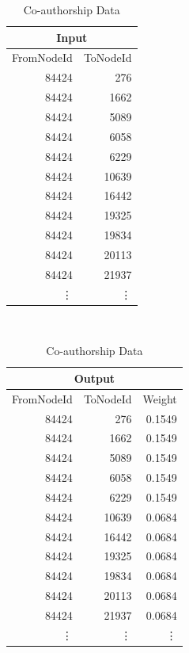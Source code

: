\begin{table}
\centering
\begin{tabular}{rr}\\ \hline
\multicolumn{2}{c}{Input}\\ \hline
FromNodeId &     ToNodeId\\ \hline
84424   & 276  \\
84424   & 1662 \\
84424   & 5089 \\
84424	& 6058 \\
84424	& 6229 \\
84424	& 10639 \\
84424	& 16442 \\
84424	& 19325 \\
84424	& 19834 \\
84424	& 20113 \\
84424	& 21937 \\
\vdots  & \vdots \\ \hline
\end{tabular}\\
\begin{tabular}{rrr}\\ \hline
\multicolumn{3}{c}{Output}\\ \hline
FromNodeId &     ToNodeId & Weight\\ \hline
84424   & 276  & 0.1549\\
84424   & 1662 & 0.1549\\
84424   & 5089 & 0.1549\\
84424   & 6058 & 0.1549\\
84424   & 6229 & 0.1549\\
84424   & 10639 & 0.0684\\
84424   & 16442 & 0.0684\\
84424   & 19325 & 0.0684\\
84424   & 19834 & 0.0684\\
84424   & 20113 & 0.0684\\
84424   & 21937 & 0.0684\\
\vdots  & \vdots & \vdots\\ \hline
\end{tabular}\\
\caption{Co-authorship Data}
\end{table}


